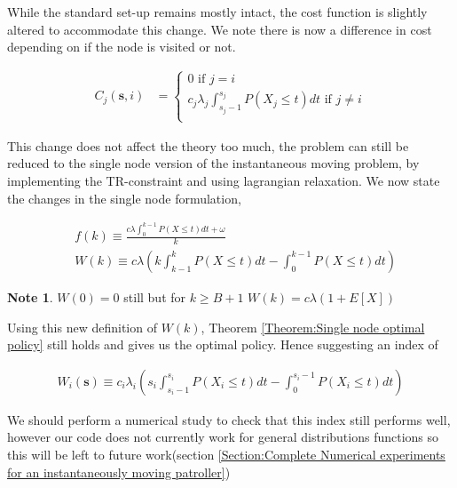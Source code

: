 \documentclass[a4paper,10pt]{article}
\theoremstyle{definition}
\theoremstyle{definition}
\theoremstyle{remark}
\theoremstyle{definition}
\newtheorem*{note}{Note}
\begin{document}
While the standard set-up remains mostly intact, the cost function is slightly altered to accommodate this change. We note there is now a difference in cost depending on if the node is visited or not.

\begin{align*}
C_{j}(\bm{s},i) &= \begin{cases}
0  \text{ if } j=i \\
c_{j} \lambda_{j} \int_{s_{j}-1}^{s_{j}} P(X_{j} \leq t) dt \text{ if } j \neq i \\
\end{cases}
\end{align*}

This change does not affect the theory too much, the problem can still be reduced to the single node version of the instantaneous moving problem, by implementing the TR-constraint and using lagrangian relaxation. We now state the changes in the single node formulation,

\begin{align*}
&f(k) \equiv \frac{c \lambda \int_{0}^{k-1} P(X \leq t) dt + \omega}{k} \\
&W(k) \equiv c \lambda \left( k \int_{k-1}^{k} P(X \leq t) dt - \int_{0}^{k-1} P(X \leq t) dt \right)
\end{align*}

\begin{note}
$W(0)=0$ still but for $k \geq B+1$ $W(k)= c \lambda (1+E[X])$
\end{note}

Using this new definition of $W(k)$, Theorem \ref{Theorem:Single node optimal policy} still holds and gives us the optimal policy. Hence suggesting an index of

\begin{align*}
W_{i}(\bm{s}) \equiv c_{i} \lambda_{i} \left( s_{i} \int_{s_{i}-1}^{s_{i}} P(X_{i} \leq t) dt - \int_{0}^{s_{i}-1} P(X_{i} \leq t) dt \right)
\end{align*}

We should perform a numerical study to check that this index still performs well, however our code does not currently work for general distributions functions so this will be left to future work(section \ref{Section:Complete Numerical experiments for an instantaneously moving patroller})
\end{document}
